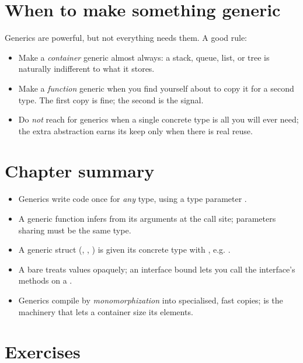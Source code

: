 \section{When to make something generic}

Generics are powerful, but not everything needs them. A good rule:

\begin{itemize}[leftmargin=1.4em]
  \item Make a \emph{container} generic almost always: a stack, queue, list, or
        tree is naturally indifferent to what it stores.
  \item Make a \emph{function} generic when you find yourself about to copy it for
        a second type. The first copy is fine; the second is the signal.
  \item Do \emph{not} reach for generics when a single concrete type is all you
        will ever need; the extra abstraction earns its keep only when there is
        real reuse.
\end{itemize}

\section{Chapter summary}

\begin{itemize}[leftmargin=1.4em]
  \item Generics write code once for \emph{any} type, using a type parameter
        .
  \item A generic function infers  from its arguments at the call site;
        parameters sharing  must be the same type.
  \item A generic struct (, , ) is
        given its concrete type with , e.g. .
  \item A bare  treats values opaquely; an interface bound  lets you call the interface's methods on a .
  \item Generics compile by \emph{monomorphization} into specialised, fast copies;
         is the machinery that lets a container size its elements.
\end{itemize}

\section{Exercises}

